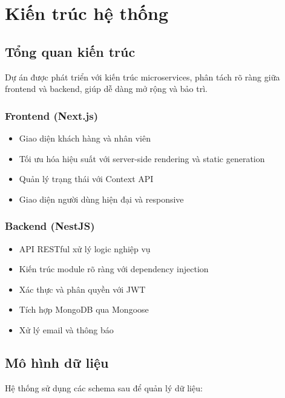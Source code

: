 \documentclass[a4paper]{article}
\begin{document}
\section{Kiến trúc hệ thống}
    \subsection{Tổng quan kiến trúc}
    
    Dự án được phát triển với kiến trúc microservices, phân tách rõ ràng giữa frontend và backend, giúp dễ dàng mở rộng và bảo trì.
    
    \subsubsection{Frontend (Next.js)}
    \begin{itemize}
        \item Giao diện khách hàng và nhân viên
        \item Tối ưu hóa hiệu suất với server-side rendering và static generation
        \item Quản lý trạng thái với Context API
        \item Giao diện người dùng hiện đại và responsive
    \end{itemize}
    
    \subsubsection{Backend (NestJS)}
    \begin{itemize}
        \item API RESTful xử lý logic nghiệp vụ
        \item Kiến trúc module rõ ràng với dependency injection
        \item Xác thực và phân quyền với JWT
        \item Tích hợp MongoDB qua Mongoose
        \item Xử lý email và thông báo
    \end{itemize}
    
    \subsection{Mô hình dữ liệu}
    
    Hệ thống sử dụng các schema sau để quản lý dữ liệu:
    
\end{document}
